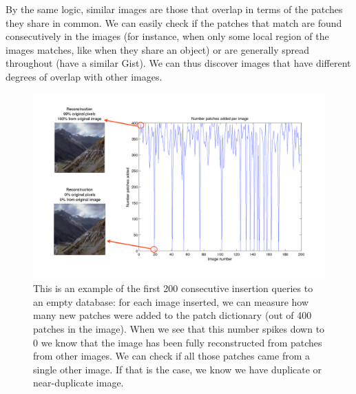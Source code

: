 By the same logic, similar images are those that overlap in terms of the patches they share in common. We can easily check if the patches that match are found consecutively in the images (for instance, when only some local region of the images matches, like when they share an object) or are generally spread throughout (have a similar Gist). We can thus discover images that have different degrees of overlap with other images.

 \begin{figure}
\hspace{-8mm}
\includegraphics[width=1.2\linewidth]{Figures/dupDetection.pdf}
\caption{This is an example of the first 200 consecutive insertion queries to an empty database: for each image inserted, we can measure how many new patches were added to the patch dictionary (out of 400 patches in the image). When we see that this number spikes down to 0 we know that the image has been fully reconstructed from patches from other images. We can check if all those patches came from a single other image. If that is the case, we know we have duplicate or near-duplicate image. }
\label{fig:dups}
\end{figure}

